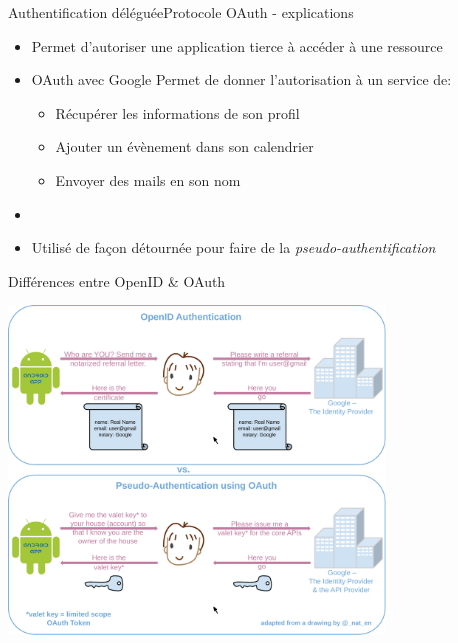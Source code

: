 \documentclass{beamer}
\begin{document}
\begin{frame}{Authentification déléguée}{Protocole OAuth - explications}
  \begin{center}
    \begin{itemize}
      \item Permet d'autoriser une application tierce à accéder à une ressource
      \pause
      \item[~]
      \begin{exampleblock}{OAuth avec Google}
        Permet de donner l'autorisation à un service de:
        \pause
        \begin{itemize}
          \item Récupérer les informations de son profil
          \pause
          \item Ajouter un évènement dans son calendrier
          \pause
          \item Envoyer des mails en son nom
        \end{itemize}
      \end{exampleblock}
      \pause
      \item[~]
      \item Utilisé de façon détournée pour faire de la \emph{pseudo-authentification}
    \end{itemize}
  \end{center}
\end{frame}

\begin{frame}{Différences entre OpenID \& OAuth}
  \begin{center}
    \includegraphics[width=0.75\textwidth]{img/OpenIDvsPseudo-AuthenticationusingOAuth}
  \end{center}
\end{frame}
\end{document}
